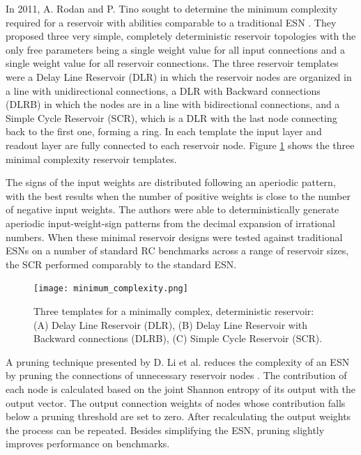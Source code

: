 \documentclass{article}
\begin{document}
      In 2011, A. Rodan and P. Tino sought to determine the minimum complexity 
      required for a reservoir with abilities comparable to a traditional ESN 
      \cite{rodan2011minimum}.  They proposed three very simple, completely 
      deterministic reservoir topologies with the only free parameters being a 
      single weight value for all input connections and a single weight value 
      for all reservoir connections. The three reservoir templates were a Delay 
      Line Reservoir (DLR) in which the reservoir nodes are organized in a  
      line with unidirectional connections, a DLR with Backward connections 
      (DLRB) in which the nodes are in a line with bidirectional connections, 
      and a Simple Cycle Reservoir (SCR), which is a DLR with the last node 
      connecting back to the first one, forming a ring. In each template the 
      input layer and readout layer are fully connected to each reservoir node.  
      Figure \ref{minimum} shows the three minimal complexity reservoir 
      templates.  \par The signs of the input weights are distributed following 
      an aperiodic pattern, with the best results when the number of positive 
      weights is close to the number of negative input weights. The authors 
      were able to deterministically generate aperiodic input-weight-sign 
      patterns from the decimal expansion of irrational numbers. When these 
      minimal reservoir designs were tested against traditional ESNs on a 
      number of standard RC benchmarks across a range of reservoir sizes, the 
      SCR performed comparably to the standard ESN. \par
     


     \begin{figure}[h!]
        \centering
            \texttt{[image: minimum\_complexity.png]}
    \caption{Three templates for a minimally complex, deterministic reservoir: 
        (A) Delay Line Reservoir (DLR), (B) Delay Line Reservoir with Backward 
            connections (DLRB), (C) Simple Cycle Reservoir (SCR). 
            \cite{rodan2011minimum}}
            \label{minimum}
            \end{figure}

      A pruning technique presented by D. Li et al. reduces the complexity of 
      an ESN by pruning the connections of unnecessary reservoir nodes 
      \cite{li2019structure}. The contribution of each node is calculated based 
      on the joint Shannon entropy of its output with the output vector.  The 
      output connection weights of nodes whose contribution falls below a 
      pruning threshold are set to zero. After recalculating the output weights 
      the process can be repeated. Besides simplifying the ESN, pruning 
      slightly improves performance on benchmarks.
      
\end{document}
